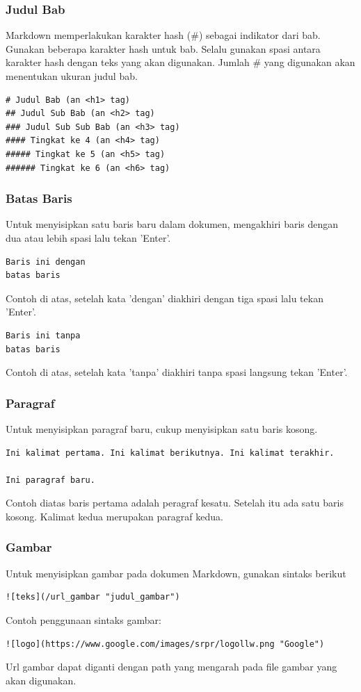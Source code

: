\subsubsection{Judul Bab}
Markdown memperlakukan karakter hash (\#) sebagai indikator dari bab. Gunakan beberapa karakter hash untuk bab. Selalu gunakan spasi antara karakter hash dengan teks yang akan digunakan. Jumlah \# yang digunakan akan menentukan ukuran judul bab.
\begin{lstlisting}
# Judul Bab (an <h1> tag)
## Judul Sub Bab (an <h2> tag)
### Judul Sub Sub Bab (an <h3> tag)
#### Tingkat ke 4 (an <h4> tag)
##### Tingkat ke 5 (an <h5> tag)
###### Tingkat ke 6 (an <h6> tag)
\end{lstlisting}

\subsubsection{Batas Baris}
Untuk menyisipkan satu baris baru dalam dokumen, mengakhiri baris dengan dua atau lebih spasi lalu tekan 'Enter'.
\begin{lstlisting}
Baris ini dengan   
batas baris
\end{lstlisting}
Contoh di atas, setelah kata 'dengan' diakhiri dengan tiga spasi lalu tekan 'Enter'.
\begin{lstlisting}
Baris ini tanpa
batas baris
\end{lstlisting}
Contoh di atas, setelah kata 'tanpa' diakhiri tanpa spasi langsung tekan 'Enter'.

\subsubsection{Paragraf}
Untuk menyisipkan paragraf baru, cukup menyisipkan satu baris kosong.
\begin{lstlisting}
Ini kalimat pertama. Ini kalimat berikutnya. Ini kalimat terakhir.

Ini paragraf baru.
\end{lstlisting}
Contoh diatas baris pertama adalah peragraf kesatu. Setelah itu ada satu baris kosong. Kalimat kedua merupakan paragraf kedua.

\subsubsection{Gambar}
Untuk menyisipkan gambar pada dokumen Markdown, gunakan sintaks berikut
\begin{lstlisting}
![teks](/url_gambar "judul_gambar")
\end{lstlisting}
Contoh penggunaan sintaks gambar: 
\begin{lstlisting}
![logo](https://www.google.com/images/srpr/logollw.png "Google")
\end{lstlisting}
Url gambar dapat diganti dengan path yang mengarah pada file gambar yang akan digunakan.

